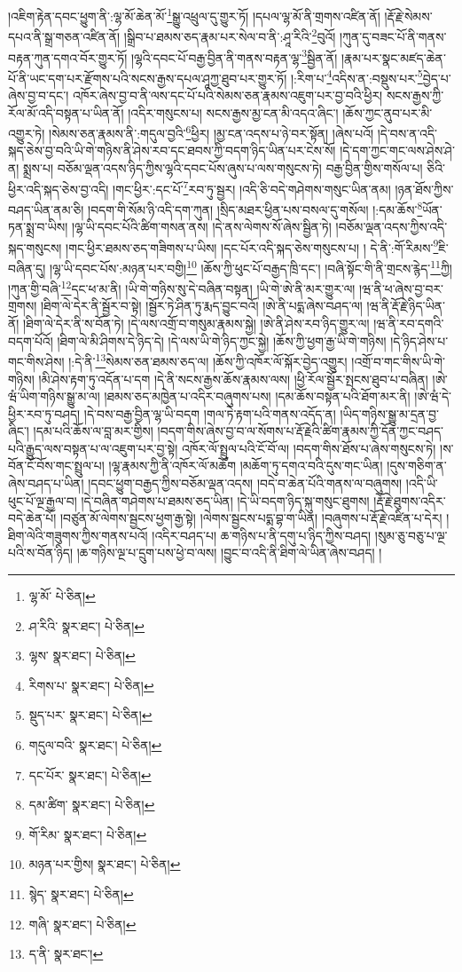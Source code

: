 །འཇིག་རྟེན་དབང་ཕྱུག་ནི་:ལྷ་མོ་ཆེན་མོ་\footnote{ལྷ་མོ་  པེ་ཅིན། }སྒྱུ་འཕྲུལ་དུ་གྱུར་ཏོ། །དཔལ་ལྷ་མོ་ནི་གྲགས་འཛིན་ནོ། །རྡོ་རྗེ་སེམས་དཔའ་ནི་སྒྲ་གཅན་འཛིན་ནོ། །སྒྲིབ་པ་ཐམས་ཅད་རྣམ་པར་སེལ་བ་ནི་:ཤཱ་རིའི་\footnote{ཤ་རིའི་  སྣར་ཐང་།  པེ་ཅིན། }བུའོ། །ཀུན་དུ་བཟང་པོ་ནི་གནས་བརྟན་ཀུན་དགའ་བོར་གྱུར་ཏོ། །ལྷའི་དབང་པོ་བརྒྱ་བྱིན་ནི་གནས་བརྟན་ལྷ་\footnote{ལྷས་  སྣར་ཐང་།  པེ་ཅིན། }སྦྱིན་ནོ། །རྣམ་པར་སྣང་མཛད་ཆེན་པོ་ནི་ཡང་དག་པར་རྫོགས་པའི་སངས་རྒྱས་དཔལ་ཤཱཀྱ་ཐུབ་པར་གྱུར་ཏོ། །:རིག་པ་\footnote{རིགས་པ་  སྣར་ཐང་།  པེ་ཅིན། }འདིས་ན་:བསྡུས་པར་\footnote{སྡུད་པར་  སྣར་ཐང་།  པེ་ཅིན། }བྱེད་པ་ཞེས་བྱ་བ་དང་། འཁོར་ཞེས་བྱ་བ་ནི་ལས་དང་པོ་པའི་སེམས་ཅན་རྣམས་འཇུག་པར་བྱ་བའི་ཕྱིར། སངས་རྒྱས་ཀྱི་རོལ་མོ་འདི་བསྟན་པ་ཡིན་ནོ། །འདིར་གསུངས་པ། སངས་རྒྱས་མྱ་ངན་མི་འདའ་ཞིང་། །ཆོས་ཀྱང་ནུབ་པར་མི་འགྱུར་ཏེ། །སེམས་ཅན་རྣམས་ནི་:གདུལ་བྱའི་\footnote{གདུལ་བའི་  སྣར་ཐང་།  པེ་ཅིན། }ཕྱིར། །མྱ་ངན་འདས་པ་ཉེ་བར་སྟོན། །ཞེས་པའོ། །དེ་བས་ན་འདི་སྐད་ཅེས་བྱ་བའི་ཡི་གེ་གཉིས་ནི་ཤེས་རབ་དང་ཐབས་ཀྱི་བདག་ཉིད་ཡིན་པར་ངེས་སོ། །དེ་དག་ཀྱང་གང་ལས་ཤེས་ཤེ་ན། སྨྲས་པ། བཅོམ་ལྡན་འདས་ཉིད་ཀྱིས་ལྷའི་དབང་པོས་ཞུས་པ་ལས་གསུངས་ཏེ། བརྒྱ་བྱིན་གྱིས་གསོལ་པ། ཅིའི་ཕྱིར་འདི་སྐད་ཅེས་བྱ་འདི། །གང་ཕྱིར་:དང་པོ་\footnote{དང་པོར་  སྣར་ཐང་།  པེ་ཅིན། }རབ་ཏུ་སྦྱར། །འདི་ཅི་བདེ་གཤེགས་གསུང་ཡིན་ནམ། །ཉན་ཐོས་ཀྱིས་བཤད་ཡིན་ནམ་ཅི། །བདག་གི་སོམ་ཉི་འདི་དག་ཀུན། །སྲིད་མཐར་ཕྱིན་པས་བསལ་དུ་གསོལ། །:དམ་ཆོས་\footnote{དམ་ཚིག་  སྣར་ཐང་།  པེ་ཅིན། }ཡོན་ཏན་སྨྲ་བ་ཡིས། །ལྷ་ཡི་དབང་པོའི་ཚིག་གསན་ནས། །དེ་ནས་ལེགས་སོ་ཞེས་སྦྱིན་ཏེ། །བཅོམ་ལྡན་འདས་ཀྱིས་འདི་སྐད་གསུངས། །གང་ཕྱིར་ཐམས་ཅད་གཟིགས་པ་ཡིས། །དང་པོར་འདི་སྐད་ཅེས་གསུངས་པ། །
དེ་ནི་:གོ་རིམས་\footnote{གོ་རིམ་  སྣར་ཐང་།  པེ་ཅིན། }ཇི་བཞིན་དུ། །ལྷ་ཡི་དབང་པོས་:མཉན་པར་བགྱི།\footnote{མཉན་པར་གྱིས།  སྣར་ཐང་།  པེ་ཅིན། } །ཆོས་ཀྱི་ཕུང་པོ་བརྒྱད་ཁྲི་དང་། །བཞི་སྟོང་གི་ནི་གྲངས་རྙེད་\footnote{སྙེད་  སྣར་ཐང་།  པེ་ཅིན། }ཀྱི། །ཀུན་གྱི་བཞི་\footnote{གཞི་  སྣར་ཐང་།  པེ་ཅིན། }དང་ཕ་མ་ནི། །ཡི་གེ་གཉིས་སུ་དེ་བཞིན་བསྟན། །ཡི་གེ་ཨེ་ནི་མར་གྱུར་ལ། །ཝ་ནི་ཕ་ཞེས་བྱ་བར་གྲགས། །ཐིག་ལེ་དེར་ནི་སྦྱོར་བ་སྟེ། །སྦྱོར་ཏེ་ཤིན་ཏུ་རྨད་བྱུང་བའོ། །ཨེ་ནི་པདྨ་ཞེས་བཤད་ལ། །ཝ་ནི་རྡོ་རྗེ་ཉིད་ཡིན་ནོ། །ཐིག་ལེ་དེར་ནི་ས་བོན་ཏེ། །དེ་ལས་འགྲོ་བ་གསུམ་རྣམས་སྐྱེ། །ཨེ་ནི་ཤེས་རབ་ཉིད་གྱུར་ལ། །ཝ་ནི་རབ་དགའི་བདག་པོའོ། །ཐིག་ལེ་མི་ཤིགས་དེ་ཉིད་དེ། །དེ་ལས་ཡི་གེ་ཉིད་ཀྱང་སྐྱེ། །ཆོས་ཀྱི་ཕྱག་རྒྱ་ཡི་གེ་གཉིས། །དེ་ཉིད་ཤེས་པ་གང་གིས་ཤེས། །:དེ་ནི་\footnote{ད་ནི་  སྣར་ཐང་། }སེམས་ཅན་ཐམས་ཅད་ལ། །ཆོས་ཀྱི་འཁོར་ལོ་སྐོར་བྱེད་འགྱུར། །འགྲོ་བ་གང་གིས་ཡི་གེ་གཉིས། །མི་ཤེས་རྟག་ཏུ་འདོན་པ་དག །དེ་ནི་སངས་རྒྱས་ཆོས་རྣམས་ལས། །ཕྱི་རོལ་སྦྱོར་སྤངས་ཐུབ་པ་བཞིན། །ཨེ་ཝཾ་ཡིག་གཉིས་སྒྱུ་མ་ལ། །ཐམས་ཅད་མཁྱེན་པ་འདིར་བཞུགས་པས། །དམ་ཆོས་བསྟན་པའི་ཐོག་མར་ནི། །ཨེ་ཝཾ་དེ་ཕྱིར་རབ་ཏུ་བཤད། །དེ་བས་བརྒྱ་བྱིན་ལྷ་ཡི་བདག །གལ་ཏེ་རྟག་པའི་གནས་འདོད་ན། །ཡིད་གཉིས་སྒྱུ་མ་དྲན་བྱ་ཞིང་། །དམ་པའི་ཆོས་ལ་བླ་མར་གྱིས། །བདག་གིས་ཞེས་བྱ་བ་ལ་སོགས་པ་རྡོ་རྗེའི་ཚིག་རྣམས་ཀྱི་དོན་ཀྱང་བཤད་པའི་རྒྱུད་ལས་བསྟན་པ་ལ་འཇུག་པར་བྱ་སྟེ། འཁོར་ལོ་སྤྲུལ་པའི་ངོ་བོ་ལ། །བདག་གིས་ཐོས་པ་ཞེས་གསུངས་ཏེ། །ས་བོན་ངོ་བོས་གང་སྤྲུལ་པ། །ལྷ་རྣམས་ཀྱི་ནི་འཁོར་ལོ་མཆོག །མཆོག་ཏུ་དགའ་བའི་དུས་གང་ཡིན། །དུས་གཅིག་ན་ཞེས་བཤད་པ་ཡིན། །དབང་ཕྱུག་བརྒྱད་ཀྱིས་བཅོམ་ལྡན་འདས། །བདེ་བ་ཆེན་པོའི་གནས་ལ་བཞུགས། །འདི་ཡི་ཕུང་པོ་ལྔ་རྒྱལ་བ། །དེ་བཞིན་གཤེགས་པ་ཐམས་ཅད་ཡིན། །དེ་ཡི་བདག་ཉིད་སྐུ་གསུང་ཐུགས། །རྡོ་རྗེ་ཐུགས་འདིར་བདེ་ཆེན་པོ། །བཙུན་མོ་ལེགས་སྦྱངས་ཕྱག་རྒྱ་སྟེ། །ལེགས་སྦྱངས་པདྨ་བྷ་ག་ཡིན། །བཞུགས་པ་རྡོ་རྗེ་འཛིན་པ་དེར། །ཐིག་ལེའི་གཟུགས་ཀྱིས་གནས་པའོ། །འདིར་བཤད་པ། ཆ་གཉིས་པ་ནི་དགུ་པ་ཉིད་ཀྱིས་བཤད། །སུམ་ཅུ་བཅུ་པ་ལྔ་པའི་ས་བོན་ཉིད། །ཆ་གཉིས་ལྔ་པ་དྲུག་པས་ཕྱེ་བ་ལས། །བྱུང་བ་འདི་ནི་ཐིག་ལེ་ཡིན་ཞེས་བཤད། །
